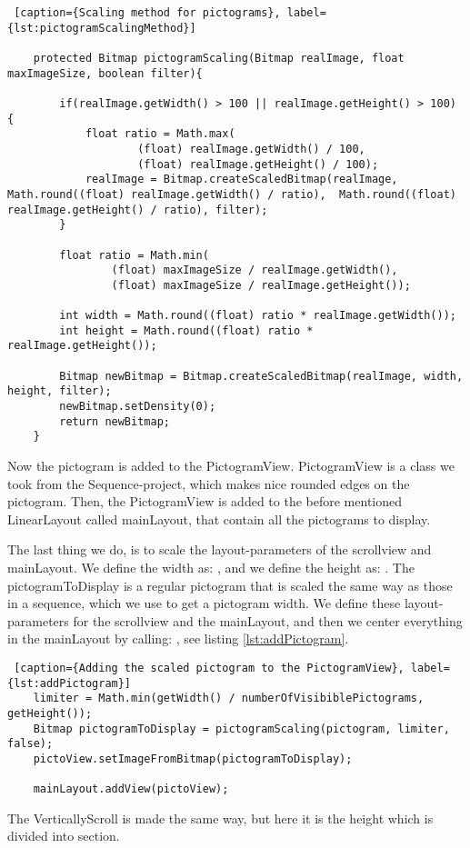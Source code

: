 \begin{lstlisting} [caption={Scaling method for pictograms}, label={lst:pictogramScalingMethod}]

    protected Bitmap pictogramScaling(Bitmap realImage, float maxImageSize, boolean filter){

        if(realImage.getWidth() > 100 || realImage.getHeight() > 100) {
            float ratio = Math.max(
                    (float) realImage.getWidth() / 100,
                    (float) realImage.getHeight() / 100);
            realImage = Bitmap.createScaledBitmap(realImage, Math.round((float) realImage.getWidth() / ratio),  Math.round((float) realImage.getHeight() / ratio), filter);
        }

        float ratio = Math.min(
                (float) maxImageSize / realImage.getWidth(),
                (float) maxImageSize / realImage.getHeight());

        int width = Math.round((float) ratio * realImage.getWidth());
        int height = Math.round((float) ratio * realImage.getHeight());

        Bitmap newBitmap = Bitmap.createScaledBitmap(realImage, width, height, filter);
        newBitmap.setDensity(0);
        return newBitmap;
    }
\end{lstlisting}

Now the pictogram is added to the PictogramView. PictogramView is a class we took from the Sequence-project, which makes nice rounded edges on the pictogram. Then, the PictogramView is added to the before mentioned LinearLayout called mainLayout, that contain all the pictograms to display.

The last thing we do, is to scale the layout-parameters of the scrollview and mainLayout. We define the width as: , and we define the height as: . The pictogramToDisplay is a regular pictogram that is scaled the same way as those in a sequence, which we use to get a pictogram width. We define these layout-parameters for the scrollview and the mainLayout, and then we center everything in the mainLayout by calling: , see listing \ref{lst:addPictogram}.

\begin{lstlisting} [caption={Adding the scaled pictogram to the PictogramView}, label={lst:addPictogram}]
	limiter = Math.min(getWidth() / numberOfVisibiblePictograms, getHeight());
	Bitmap pictogramToDisplay = pictogramScaling(pictogram, limiter, false);
	pictoView.setImageFromBitmap(pictogramToDisplay);
	
	mainLayout.addView(pictoView);
\end{lstlisting}

The VerticallyScroll is made the same way, but here it is the height which is divided into section.


